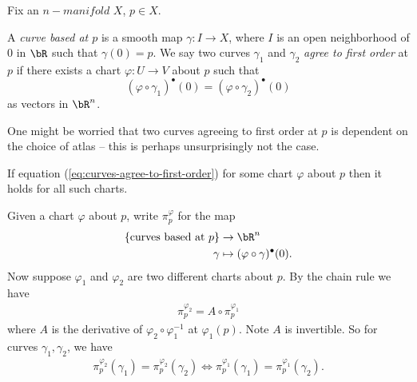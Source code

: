 Fix an $n-manifold$ $X$, $p \in X$.
\begin{defn}\label{defn:curve-based-at-p}
	A \emph{curve based at $p$} is a smooth map $\gamma:I \to X$, where $I$ is an open neighborhood of $0$ in $\bR$ such that $\gamma(0) = p$. We say two curves $\gamma_1$ and $\gamma_2$ \emph{agree to first order} at $p$ if there exists a chart $\varphi:U \to V$ about $p$ such that
	\begin{equation}\label{eq:curves-agree-to-first-order}
		\left(\varphi \circ \gamma_1\right)^\bullet(0) = \left(\varphi\circ \gamma_2\right)^\bullet(0)
	\end{equation}
	as vectors in $\bR^n$.
\end{defn}
One might be worried that two curves agreeing to first order at $p$ is dependent on the choice of atlas -- this is perhaps unsurprisingly not the case.
\begin{lem}\label{lem:first-order-agreement-independent-of-chart}
	If equation (\ref{eq:curves-agree-to-first-order}) for some chart $\varphi$ about $p$ then it holds for all such charts.
\end{lem}
\begin{prf}
	Given a chart $\varphi$ about $p$, write $\pi_p^\varphi$ for the map
	\begin{align*}
		\{\text{curves based at $p$}\} &\to \bR^n \\
		\gamma &\mapsto (\varphi\circ \gamma)^\bullet(0).
	\end{align*}
	Now suppose $\varphi_1$ and $\varphi_2$ are two different charts about $p$. By the chain rule we have 
	\begin{align*}	
	    \pi_p^{\varphi_2} = A \circ \pi_p^{\varphi_1}
	\end{align*}
	where $A$ is the derivative of $\varphi_2\circ \varphi_1^{-1}$ at $\varphi_1(p)$. Note $A$ is invertible. So for curves $\gamma_1, \gamma_2$, we have
	\begin{align*}
		\pi_p^{\varphi_2}(\gamma_1) = \pi_p^{\varphi_2}(\gamma_2) \iff \pi_p^{\varphi_1}(\gamma_1) = \pi_p^{\varphi_1}(\gamma_2).
	\end{align*}
\end{prf}

